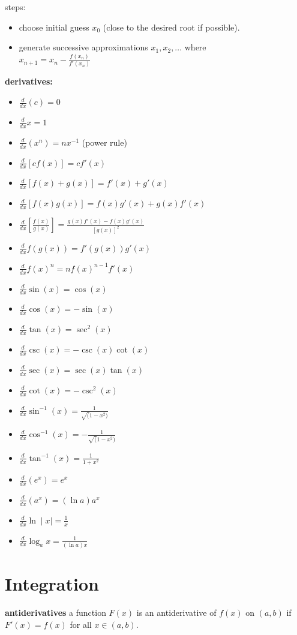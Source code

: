 \documentclass{article}
\begin{document}
steps:
	\begin{itemize}
		\item choose initial guess $x_0$ (close to the desired root if possible).
		\item generate successive approximations $x_1, x_2, \ldots$ where\\ $x_{n + 1} = x_n - \frac{f(x_n)}{f'(x_n)}$
	\end{itemize}

\textbf{derivatives:}
	\begin{itemize}
		\item $\frac{d}{dx}(c) = 0$
		\item $\frac{d}{dx}x = 1$
		\item $\frac{d}{dx}(x^n) = nx^{-1}$ (power rule)
		\item $\frac{d}{dx}[cf(x)] = cf'(x)$
		\item $\frac{d}{dx}[f(x)+g(x)] = f'(x) + g'(x)$
		\item $\frac{d}{dx}[f(x)g(x)] = f(x)g'(x) + g(x)f'(x)$
		\item $\frac{d}{dx}[\frac{f(x)}{g(x)}] = \frac{g(x)f'(x) - f(x)g'(x)}{[g(x)]^2}$
		\item $\frac{d}{dx}f(g(x)) = f'(g(x))g'(x)$
		\item $\frac{d}{dx}f(x)^n = nf(x)^{n-1}f'(x)$
		\item $\frac{d}{dx}\sin(x) = \cos(x)$
		\item $\frac{d}{dx}\cos(x) = -\sin(x)$
		\item $\frac{d}{dx}\tan(x) = \sec^2(x)$
		\item $\frac{d}{dx}\csc(x) = -\csc(x)\cot(x)$
		\item $\frac{d}{dx}\sec(x) = \sec(x)\tan(x)$
		\item $\frac{d}{dx}\cot(x) = -\csc^2(x)$
		\item $\frac{d}{dx}\sin^{-1}(x) = \frac{1}{\sqrt(1 - x^2)}$
		\item $\frac{d}{dx}\cos^{-1}(x) = -\frac{1}{\sqrt(1 - x^2)}$
		\item $\frac{d}{dx}\tan^{-1}(x) = \frac{1}{1 + x^2}$
		\item $\frac{d}{dx}(e^x) = e^x$
		\item $\frac{d}{dx}(a^x) = (\ln a)a^x$
		\item $\frac{d}{dx}\ln\mid x\mid = \frac{1}{x}$
		\item $\frac{d}{dx}\log_ax = \frac{1}{(\ln a)x}$
	\end{itemize}

\section*{Integration}
\textbf{antiderivatives} a function $F(x)$ is an antiderivative of $f(x)$ on $(a, b)$ if $F'(x) = f(x)$ for all $x \in (a, b)$.\\
\end{document}
